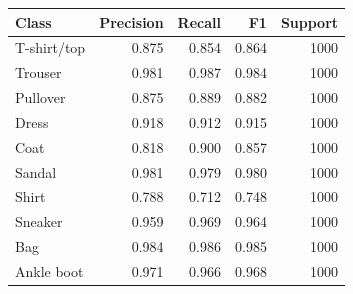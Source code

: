 \begin{tabular}{lrrrr}
\toprule
Class & Precision & Recall & F1 & Support \\
\midrule
T-shirt/top & 0.875 & 0.854 & 0.864 & 1000 \\
Trouser & 0.981 & 0.987 & 0.984 & 1000 \\
Pullover & 0.875 & 0.889 & 0.882 & 1000 \\
Dress & 0.918 & 0.912 & 0.915 & 1000 \\
Coat & 0.818 & 0.900 & 0.857 & 1000 \\
Sandal & 0.981 & 0.979 & 0.980 & 1000 \\
Shirt & 0.788 & 0.712 & 0.748 & 1000 \\
Sneaker & 0.959 & 0.969 & 0.964 & 1000 \\
Bag & 0.984 & 0.986 & 0.985 & 1000 \\
Ankle boot & 0.971 & 0.966 & 0.968 & 1000 \\
\bottomrule
\end{tabular}
